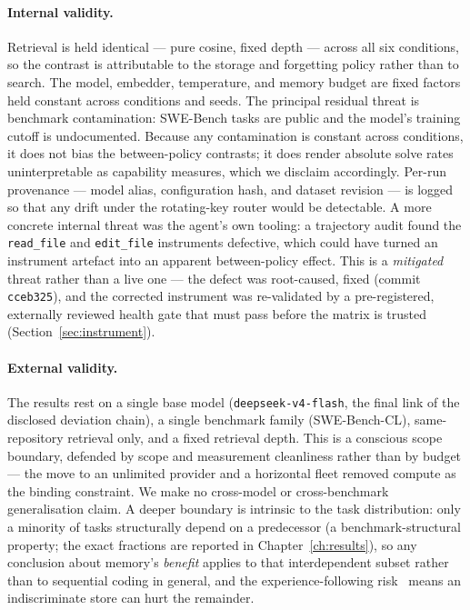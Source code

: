 \paragraph{Internal validity.}
Retrieval is held identical --- pure cosine, fixed depth --- across all six conditions, so
the contrast is attributable to the storage and forgetting policy rather than to search. The
model, embedder, temperature, and memory budget are fixed factors held constant across
conditions and seeds. The principal residual threat is benchmark contamination: SWE-Bench
tasks are public and the model's training cutoff is undocumented. Because any contamination
is constant across conditions, it does not bias the between-policy contrasts; it does render
absolute solve rates uninterpretable as capability measures, which we disclaim accordingly.
Per-run provenance --- model alias, configuration hash, and dataset revision --- is logged so
that any drift under the rotating-key router would be detectable. A more concrete internal
threat was the agent's own tooling: a trajectory audit found the \texttt{read\_file} and
\texttt{edit\_file} instruments defective, which could have turned an instrument artefact into
an apparent between-policy effect. This is a \emph{mitigated} threat rather than a live one
--- the defect was root-caused, fixed (commit \texttt{cceb325}), and the corrected instrument
was re-validated by a pre-registered, externally reviewed health gate that must pass before
the matrix is trusted (Section~\ref{sec:instrument}).

\paragraph{External validity.}
The results rest on a single base model (\texttt{deepseek-v4-flash}, the final link of the
disclosed deviation chain), a single benchmark family (SWE-Bench-CL), same-repository
retrieval only, and a fixed retrieval depth. This is a conscious scope boundary, defended by
scope and measurement cleanliness rather than by budget --- the move to an unlimited provider
and a horizontal fleet removed compute as the binding constraint. We make no cross-model or
cross-benchmark generalisation claim. A deeper boundary is intrinsic to the task
distribution: only a minority of tasks structurally depend on a predecessor (a
benchmark-structural property; the exact fractions are reported in Chapter~\ref{ch:results}),
so any conclusion about memory's \emph{benefit} applies to that interdependent subset rather
than to sequential coding in general, and the
experience-following risk~\cite{xiong2025} means an indiscriminate store can hurt the
remainder.

